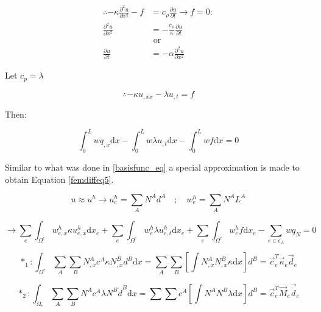 \begin{equation}\label{femdiffeq2}
\begin{aligned}
\therefore -\kappa \frac{\partial^2 u}{\partial x^2} - f &= c_{\rho}\frac{\partial u}{\partial t} \rightarrow f=0:\\
\frac{\partial^2 u}{\partial x^2} &= - \frac{c_{\rho}}{\kappa} \frac{\partial u}{\partial t} \quad \\
&\text{ or } \\
\frac{\partial u}{\partial t} &= -\alpha \frac{\partial^2 u}{\partial x^2}
\end{aligned}
\end{equation}


Let $c_p = \lambda$ 

\begin{equation}\label{femdiffeq3}
\therefore -\kappa u_{,xx} - \lambda u_{,t} = f
\end{equation}


Then:

\begin{equation}\label{femdiffeq4}
\int_0^L w q_{,x} \text{d}x - \int_0^L w \lambda u_{,t} \text{d}x - \int_0^L w f \text{d}x = 0
\end{equation}


Similar to what was done in \ref{basisfunc_eq} a special approximation is made to obtain Equation \ref{femdiffeq5}.

\begin{equation}\label{femdiffeq5}
u \approx u^h \rightarrow u_e^h = \sum_{A}N^A d^A \quad;\quad w_e^h = \sum_{A}N^A L^A
\end{equation}


\begin{equation}\label{femdiffeq6}
\rightarrow \sum_e \int_{\Omega^e} w_{e,x}^h \kappa u_{e,x}^h \text{d}x_e + \sum_e \int_{\Omega^e} w_e^h \lambda u_{e,t}^h \text{d}x_e + \sum_e \int_{\Omega^e} w_e^h f \text{d}x_e - \sum_{e \in \epsilon_A} w q_N = 0
\end{equation}

\begin{equation*}
*_1: \int_{\Omega^e} \sum_A \sum_B N_{,x}^A c^A \kappa N_{,x}^B d^B \text{d}x = \sum_A\sum_B \left[ \int N_{,x}^A N_{,x}^B \kappa \text{d}x  \right]d^B = \vec{c}_e^T \vec{\kappa}_e \vec{d}_e
\end{equation*}


\begin{equation*}
*_2: \int_{\Omega_e} \sum_A \sum_B N^A c^A \lambda N^B \dot{d}^B \text{d}x = \sum\sum c^A \left[ \int N^A N^B \lambda \text{d}x \right] d^B = \vec{c}_e^T \vec{M}_e \vec{\dot{d}}_e
\end{equation*}


